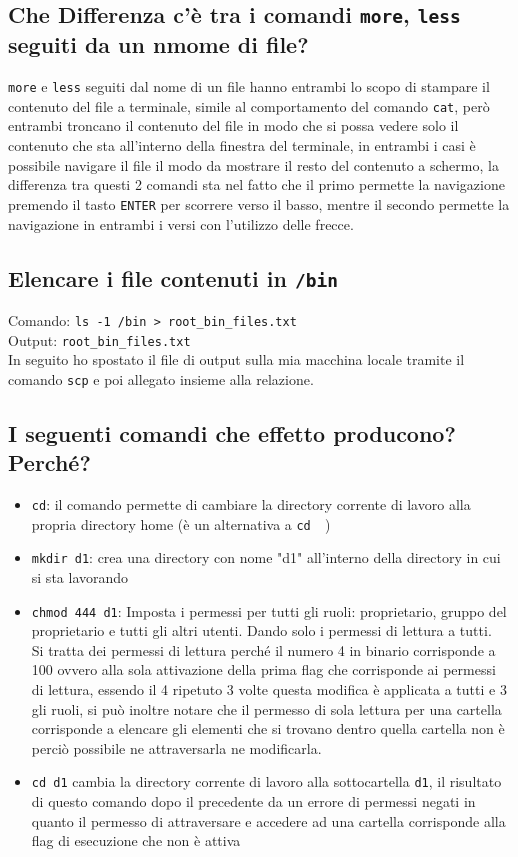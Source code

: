 \documentclass{article}
\begin{document}
\subsection{Che Differenza c'è tra i comandi \texttt{more}, \texttt{less} seguiti da un nmome di file?}
\texttt{more} e \texttt{less} seguiti dal nome di un file hanno entrambi lo scopo di stampare il contenuto del file a terminale,
simile al comportamento del comando \texttt{cat}, però entrambi troncano il contenuto del file in modo che si possa vedere solo
il contenuto che sta all'interno della finestra del terminale, in entrambi i casi è possibile navigare il file il modo da mostrare
il resto del contenuto a schermo, la differenza tra questi 2 comandi sta nel fatto che il primo permette la navigazione premendo il tasto
\texttt{ENTER} per scorrere verso il basso, mentre il secondo permette la navigazione in entrambi i versi con l'utilizzo delle frecce.

\subsection{Elencare i file contenuti in \texttt{/bin}}
Comando: \texttt{ls -1 /bin > root\_bin\_files.txt}\\
Output: \texttt{root\_bin\_files.txt}\\
In seguito ho spostato il file di output sulla mia macchina locale tramite il comando \texttt{scp} e poi allegato insieme alla relazione.

\subsection{I seguenti comandi che effetto producono? Perché?}
\begin{itemize}
    \item \texttt{cd}: il comando permette di cambiare la directory corrente di lavoro alla propria directory home
    (è un alternativa a \texttt{cd ~})
    \item \texttt{mkdir d1}: crea una directory con nome "d1" all'interno della directory in cui si sta lavorando
    \item \texttt{chmod 444 d1}: Imposta i permessi per tutti gli ruoli: proprietario, gruppo del proprietario e tutti gli altri utenti. 
    Dando solo i permessi di lettura a tutti.\\ 
    Si tratta dei permessi di lettura perché il numero 4 in binario corrisponde a 100 ovvero alla sola attivazione della prima flag
    che corrisponde ai permessi di lettura, essendo il 4 ripetuto 3 volte questa modifica è applicata a tutti e 3 gli ruoli, 
    si può inoltre notare che il permesso di sola lettura per una cartella corrisponde a elencare gli elementi che si trovano dentro quella cartella
    non è perciò possibile ne attraversarla ne modificarla.
    \item \texttt{cd d1} cambia la directory corrente di lavoro alla sottocartella \texttt{d1}, il risultato di questo comando dopo il precedente da
    un errore di permessi negati in quanto il permesso di attraversare e accedere ad una cartella corrisponde alla flag di esecuzione che non è attiva
\end{itemize}
\end{document}
